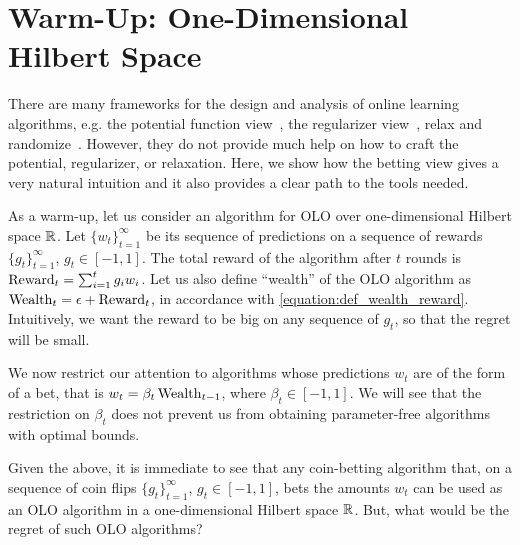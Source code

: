 \section{Warm-Up: One-Dimensional Hilbert Space}
\label{section:one-dimensional-hilbert-space-olo}

There are many frameworks for the design and analysis of online learning
algorithms, e.g. the potential function view~\cite{Cesa-Bianchi-Lugosi-2006},
the regularizer view~\cite{Shalev-Shwartz-2011}, relax and
randomize~\cite{Rakhlin-Shamir-Sridharan-2012}. However, they do not provide
much help on how to craft the potential, regularizer, or relaxation.  Here, we
show how the betting view gives a very natural intuition and it also provides a
clear path to the tools needed.

As a warm-up, let us consider an algorithm for OLO over one-dimensional Hilbert
space $\mathbb{R}$.  Let $\{w_t\}_{t=1}^\infty$ be its sequence of predictions on a
sequence of rewards $\{g_t\}_{t=1}^\infty$, $g_t \in [-1,1]$. The total reward
of the algorithm after $t$ rounds is $\operatorname{Reward}_t = \sum_{i=1}^t g_i w_i$.
Let us also define ``wealth'' of the OLO algorithm as $\operatorname{Wealth}_t = \epsilon +
\operatorname{Reward}_t$, in accordance with \eqref{equation:def_wealth_reward}.
Intuitively, we want the reward to be big on any sequence of $g_t$, so that
the regret will be small.

We now restrict our attention to algorithms whose
predictions $w_t$ are of the form of a bet, that is 
$
w_t = \beta_t \operatorname{Wealth}_{t-1}
$, where $\beta_t \in [-1,1]$.
We will see that the restriction on $\beta_t$ does not prevent us from obtaining
parameter-free algorithms with optimal bounds.

Given the above, it is immediate to see that any coin-betting
algorithm that, on a sequence of coin flips $\{g_t\}_{t=1}^\infty$, $g_t \in
[-1,1]$, bets the amounts $w_t$ can be used as an OLO
algorithm in a one-dimensional Hilbert space $\mathbb{R}$. But, what would be the regret of such OLO algorithms?

